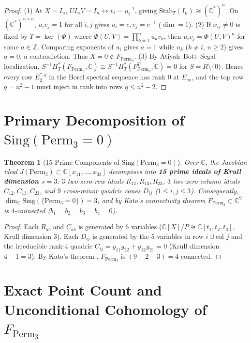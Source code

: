 \documentclass[11pt,a4paper]{article}
\newtheorem{theorem}{Theorem}[section]
\theoremstyle{definition}
\begin{document}
\begin{proof}
(1) At $X = I_n$, $U I_n V = I_n \iff v_i = u_i^{-1}$, giving $\text{Stab}_T(I_n) \cong (\mathbb{C}^*)^n$. On $(\mathbb{C}^*)^{n \times n}$, $u_i v_j = 1$ for all $i, j$ gives $u_i = c, v_j = c^{-1}$ ($\dim = 1$).
(2) If $x_{ij} \neq 0$ is fixed by $T = \ker(\Phi)$ where $\Phi(U,V) = \prod_{k=1}^n u_k v_k$, then $u_i v_j = \Phi(U,V)^a$ for some $a \in \mathbb{Z}$. Comparing exponents of $u_i$ gives $a=1$ while $u_k$ ($k \neq i$, $n \ge 2$) gives $a=0$, a contradiction. Thus $X = 0 \notin F_{\text{Perm}_n}$.
(3) By Atiyah--Bott--Segal localization, $S^{-1} H^*_T(F_{\text{Perm}_n}, \mathbb{C}) \cong S^{-1} H^*_T(F_{\text{Perm}_n}^T, \mathbb{C}) = 0$ for $S = R \setminus \{0\}$. Hence every row $E_2^{*,q}$ in the Borel spectral sequence has rank $0$ at $E_\infty$, and the top row $q = n^2-1$ must inject in rank into rows $q \le n^2-2$.
\end{proof}

\section{Primary Decomposition of $\text{Sing}(\text{Perm}_3 = 0)$}

\begin{theorem}[$15$ Prime Components of $\text{Sing}(\text{Perm}_3 = 0)$]
\label{thm:jacobian}
Over $\mathbb{C}$, the Jacobian ideal $J(\text{Perm}_3) \subset \mathbb{C}[x_{11}, \dots, x_{33}]$ decomposes into \textbf{15 prime ideals of Krull dimension $s = 3$}: $3$ two-zero-row ideals $R_{12}, R_{13}, R_{23}$, $3$ two-zero-column ideals $C_{12}, C_{13}, C_{23}$, and $9$ cross-minor quadric cones $D_{ij}$ ($1 \le i, j \le 3$). Consequently, $\dim_{\mathbb{C}} \text{Sing}(\{\text{Perm}_3 = 0\}) = 3$, and by Kato's connectivity theorem \cite{kato} $F_{\text{Perm}_3} \subset \mathbb{C}^9$ is $4$-connected ($b_1 = b_2 = b_3 = b_4 = 0$).
\end{theorem}

\begin{proof}
Each $R_{ab}$ and $C_{ab}$ is generated by $6$ variables ($\mathbb{C}[X]/P \cong \mathbb{C}[t_1, t_2, t_3]$, Krull dimension $3$). Each $D_{ij}$ is generated by the $5$ variables in row $i \cup \text{col } j$ and the irreducible rank-$4$ quadric $C_{ij} = y_{11}y_{22} + y_{12}y_{21} = 0$ (Krull dimension $4 - 1 = 3$). By Kato's theorem \cite{kato}, $F_{\text{Perm}_3}$ is $(9 - 2 - 3) = 4$-connected.
\end{proof}

\section{Exact Point Count and Unconditional Cohomology of $F_{\text{Perm}_3}$}
\end{document}
